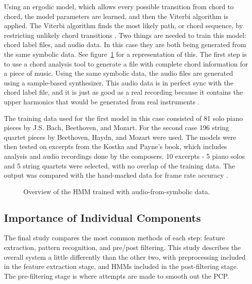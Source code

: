 \documentclass{sig-alternate}
\begin{document}

Using an ergodic model, which allows every possible transition from chord to chord, the model parameters are learned, and then the Viterbi algorithm is applied. The Viterbi algorithm finds the most likely path, or chord sequence, by restricting unlikely chord transitions \cite{TaeMin:2014}. Two things are needed to train this model: chord label files, and audio data. In this case they are both being generated from the same symbolic data. See figure~\ref{fig:fig1} for a representation of this. The first step is to use a chord analysis tool to generate a file with complete chord information for a piece of music. Using the same symbolic data, the audio files are generated using a sample-based synthesizer. This audio data is in perfect sync with the chord label file, and it is just as good as a real recording because it contains the upper harmonics that would be generated from real instruments \cite{Lee:2006}.


The training data used for the first model in this case consisted of 81 solo piano pieces by J.S. Bach, Beethoven, and Mozart. For the second case 196 string quartet pieces by Beethoven, Haydn, and Mozart were used. The models were then tested on excerpts from the Kostka and Payne's book, which includes analysis and audio recordings done by the composers. 10 excerpts - 5 piano solos and 5 string quartets were selected, with no overlap of the training data. The output was compared with the hand-marked data for frame rate accuracy \cite{Lee:2006}. 

\begin{figure}
\centering
{}
\caption{Overview of the HMM trained with audio-from-symbolic data.}
\label{fig:fig1}
\end{figure}

\subsection{Importance of Individual Components}

The final study \cite{TaeMin:2014} compares the most common methods of each step: feature extraction, pattern recognition, and pre/post filtering. This study describes the overall system a little differently than the other two, with preprocessing included in the feature extraction stage, and HMMs included in the post-filtering stage. The pre-filtering stage is where attempts are made to smooth out the PCP. 
\end{document}
